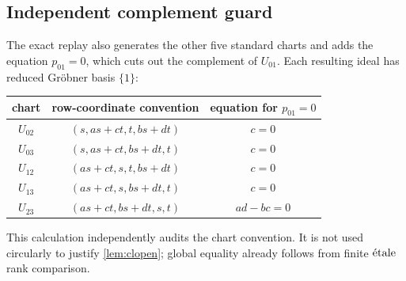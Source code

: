 \subsection{Independent complement guard}

The exact replay also generates the other five standard charts and adds the
equation \(p_{01}=0\), which cuts out the complement of \(U_{01}\).  Each
resulting ideal has reduced Gr\"obner basis \(\{1\}\):
\begin{center}
\begin{tabular}{@{}ccc@{}}
\toprule
chart & row-coordinate convention & equation for \(p_{01}=0\)\\
\midrule
\(U_{02}\)&\((s,as+ct,t,bs+dt)\)&\(c=0\)\\
\(U_{03}\)&\((s,as+ct,bs+dt,t)\)&\(c=0\)\\
\(U_{12}\)&\((as+ct,s,t,bs+dt)\)&\(c=0\)\\
\(U_{13}\)&\((as+ct,s,bs+dt,t)\)&\(c=0\)\\
\(U_{23}\)&\((as+ct,bs+dt,s,t)\)&\(ad-bc=0\)\\
\bottomrule
\end{tabular}
\end{center}
This calculation independently audits the chart convention.  It is not used
circularly to justify \cref{lem:clopen}; global equality already follows
from finite \(\mathrm{\acute{e}tale}\) rank comparison.

